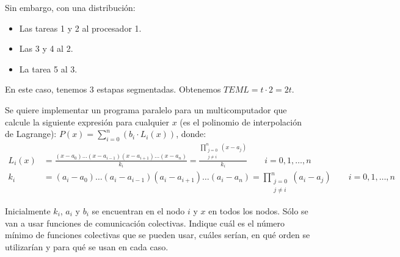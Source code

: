 \begin{ejercicio}
\begin{enumerate}
    Sin embargo, con una distribución:
    \begin{itemize}
        \item Las tareas 1 y 2 al procesador 1.
        \item Las 3 y 4 al 2.
        \item La tarea 5 al 3.
    \end{itemize}
    En este caso, tenemos 3 estapas segmentadas. Obtenemos $TEML = t\cdot 2 = 2t$.
    
\end{enumerate}



\end{ejercicio}


\begin{ejercicio}
    Se quiere implementar un programa paralelo para un multicomputador que calcule la siguiente
    expresión para cualquier $x$ (es el polinomio de interpolación de Lagrange):
    $P(x) = \sum\limits_{i=0}^{n} \left(b_i\cdot L_i(x)\right)$, donde:
    \begin{align*}
        L_i(x) &= \frac{(x-a_0) \ldots  (x-{a_{i-1}})(x-{a_{i+1}}) \ldots  (x-a_n)}{k_i}
        = \frac{\prod\limits_{\substack{j=0\\ j\neq i}}^{n} (x-a_j)}{k_i} \qquad i=0,1,\dots,n\\
        k_i &= (a_i-a_0) \ldots  (a_i-a_{i-1})(a_i-a_{i+1}) \ldots  (a_i-a_n)= \prod\limits_{\substack{j=0\\ j\neq i}}^{n} (a_i-a_j) \qquad i=0,1,\dots,n
    \end{align*}

    Inicialmente $k_i$, $a_i$ y $b_i$ se encuentran en el nodo $i$ y $x$ en todos los nodos. Sólo se van a usar funciones de
    comunicación colectivas. Indique cuál es el número mínimo de funciones colectivas que se pueden usar,
    cuáles serían, en qué orden se utilizarían y para qué se usan en cada caso.
\end{ejercicio}

